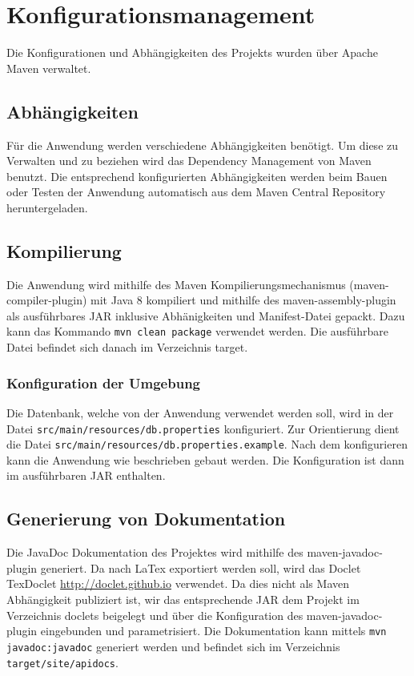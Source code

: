 \section{Konfigurationsmanagement}
Die Konfigurationen und Abhängigkeiten des Projekts wurden über Apache Maven verwaltet.

\subsection{Abhängigkeiten}
Für die Anwendung werden verschiedene Abhängigkeiten benötigt. Um diese zu Verwalten und zu beziehen wird das Dependency Management von Maven benutzt. Die entsprechend konfigurierten Abhängigkeiten werden beim Bauen oder Testen der Anwendung automatisch aus dem Maven Central Repository heruntergeladen.

\subsection{Kompilierung}
Die Anwendung wird mithilfe des Maven Kompilierungsmechanismus (maven-compiler-plugin) mit Java 8 kompiliert und mithilfe des maven-assembly-plugin als ausführbares JAR inklusive Abhänigkeiten und Manifest-Datei gepackt. Dazu kann das Kommando \texttt{mvn clean package} verwendet werden. Die ausführbare Datei befindet sich danach im Verzeichnis target.

\subsubsection{Konfiguration der Umgebung}
Die Datenbank, welche von der Anwendung verwendet werden soll, wird in der Datei \texttt{src/main/resources/db.properties} konfiguriert. Zur Orientierung dient die Datei \texttt{src/main/resources/db.properties.example}. Nach dem konfigurieren kann die Anwendung wie beschrieben gebaut werden. Die Konfiguration ist dann im ausführbaren JAR enthalten.

\subsection{Generierung von Dokumentation}
Die JavaDoc Dokumentation des Projektes wird mithilfe des maven-javadoc-plugin generiert. Da nach LaTex exportiert werden soll, wird das Doclet TexDoclet \href{http://doclet.github.io}{http://doclet.github.io} verwendet. Da dies nicht als Maven Abhängigkeit publiziert ist, wir das entsprechende JAR dem Projekt im Verzeichnis doclets beigelegt und über die Konfiguration des maven-javadoc-plugin eingebunden und parametrisiert. Die Dokumentation kann mittels \texttt{mvn javadoc:javadoc} generiert werden und befindet sich im Verzeichnis \texttt{target/site/apidocs}.

